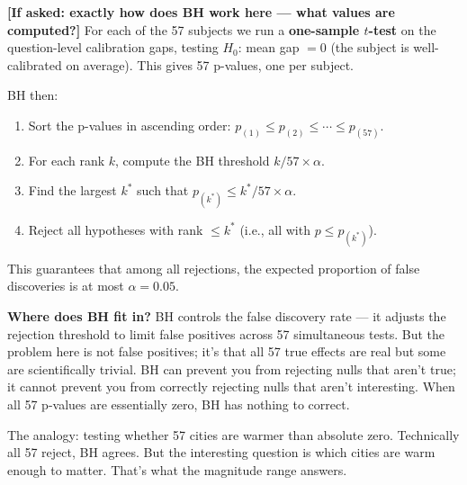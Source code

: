 \documentclass[aspectratio=169,11pt]{beamer}
\begin{document}
{  \textbf{[If asked: exactly how does BH work here — what values are computed?]}
  For each of the 57 subjects we run a \textbf{one-sample $t$-test} on the
  question-level calibration gaps, testing $H_0$: mean gap $= 0$ (the subject is
  well-calibrated on average). This gives 57 p-values, one per subject.

  BH then:
  \begin{enumerate}
    \item Sort the p-values in ascending order: $p_{(1)} \le p_{(2)} \le \cdots \le p_{(57)}$.
    \item For each rank $k$, compute the BH threshold $k/57 \times \alpha$.
    \item Find the largest $k^*$ such that $p_{(k^*)} \le k^*/57 \times \alpha$.
    \item Reject all hypotheses with rank $\le k^*$ (i.e., all with $p \le p_{(k^*)}$).
  \end{enumerate}
  This guarantees that among all rejections, the expected proportion of false
  discoveries is at most $\alpha = 0.05$.

  \textbf{Where does BH fit in?} BH controls the false discovery rate --- it adjusts
  the rejection threshold to limit false positives across 57 simultaneous tests.
  But the problem here is not false positives; it's that all 57 true effects are
  real but some are scientifically trivial. BH can prevent you from rejecting nulls
  that aren't true; it cannot prevent you from correctly rejecting nulls that aren't
  interesting. When all 57 p-values are essentially zero, BH has nothing to correct.

  The analogy: testing whether 57 cities are warmer than absolute zero. Technically
  all 57 reject, BH agrees. But the interesting question is which cities are warm
  enough to matter. That's what the magnitude range answers.
}

\end{document}
